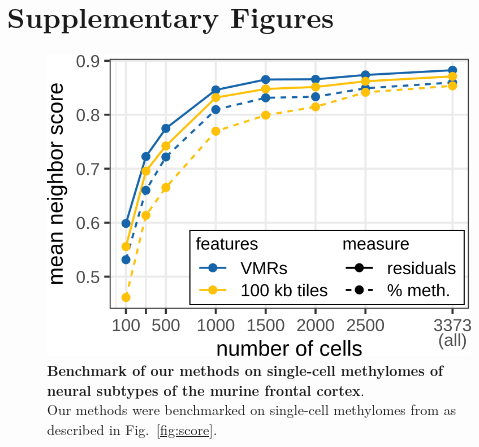\documentclass[twocolumn,10pt]{article}
\begin{document}
{\small }

\newpage
\section{Supplementary Figures}

\setcounter{figure}{0}
\renewcommand{\thefigure}{S\arabic{figure}}

\begin{figure}
    \begin{center}
        \includegraphics[width=0.8\columnwidth]{figures/SFig_benchmark.png}
    \end{center}
    \caption{\small \textbf{Benchmark of our methods on single-cell methylomes of neural subtypes of the murine frontal cortex}.\\
    Our methods were benchmarked on single-cell methylomes from \citet{luo2017single} as described in Fig.~\ref{fig:score}.
    }
    \label{fig:score_luo}
\end{figure}
\end{document}
